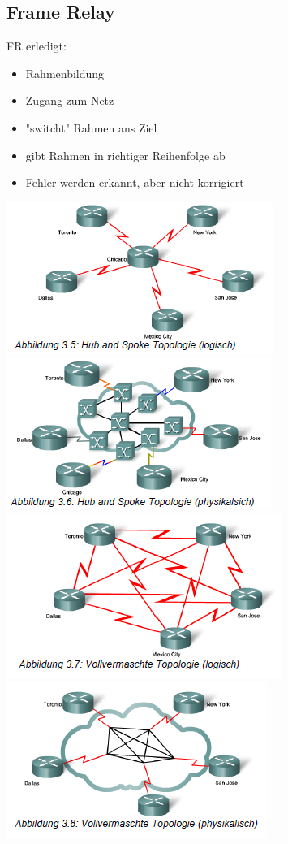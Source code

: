 \documentclass[landscape,twocolumn,a4paper]{article}
\begin{document}
\begin{footnotesize}
\section{Frame Relay}
FR erledigt:
\begin{itemize}
	\item Rahmenbildung
	\item Zugang zum Netz
	\item "switcht" Rahmen ans Ziel
	\item gibt Rahmen in richtiger Reihenfolge ab
	\item Fehler werden erkannt, aber nicht korrigiert
\end{itemize}
\includegraphics[scale=0.3]{hub-spoke-logisch.png}
\includegraphics[scale=0.3]{hub-spoke-physikalisch.png}
\includegraphics[scale=0.3]{vollvermascht-logisch.png}
\includegraphics[scale=0.3]{vollvermascht-physikalisch.png}\\

\end{footnotesize}
\end{document}
